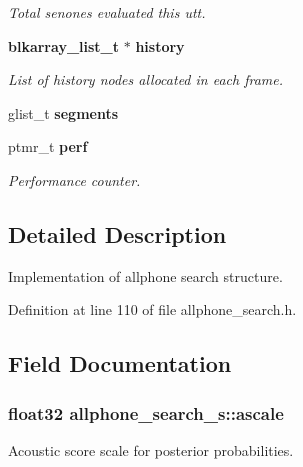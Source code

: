 \begin{DoxyCompactItemize}
\begin{DoxyCompactList}\small\item\em Total senones evaluated this utt. \end{DoxyCompactList}\item 
{\bf blkarray\-\_\-list\-\_\-t} $\ast$ {\bf history}\label{structallphone__search__s_a6f01de182b60ca03ab9fed3bc63fadc5}

\begin{DoxyCompactList}\small\item\em List of history nodes allocated in each frame. \end{DoxyCompactList}\item 
glist\-\_\-t {\bfseries segments}\label{structallphone__search__s_a15739824f77c6f825d5324e826458721}

\item 
ptmr\-\_\-t {\bf perf}\label{structallphone__search__s_ab933d7d82322055b5d0c62e27d7c1f5f}

\begin{DoxyCompactList}\small\item\em Performance counter. \end{DoxyCompactList}\end{DoxyCompactItemize}


\subsection{Detailed Description}
Implementation of allphone search structure. 

Definition at line 110 of file allphone\-\_\-search.\-h.



\subsection{Field Documentation}
\subsubsection[{ascale}]{\setlength{\rightskip}{0pt plus 5cm}float32 allphone\-\_\-search\-\_\-s\-::ascale}\label{structallphone__search__s_a9ad3ecc228af52131028fb91927563dc}


Acoustic score scale for posterior probabilities. 



